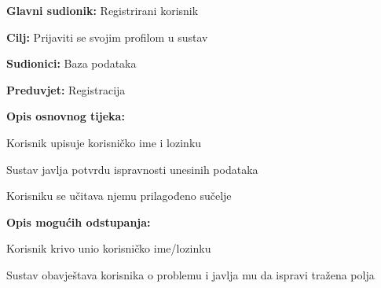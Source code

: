 					\noindent {}
					\begin{packed_item}
	
						\item \textbf{Glavni sudionik: }Registrirani korisnik
						\item  \textbf{Cilj:} Prijaviti se svojim profilom u sustav
						\item  \textbf{Sudionici:} Baza podataka
						\item  \textbf{Preduvjet:} Registracija
						\item  \textbf{Opis osnovnog tijeka:}
						
						\item[] \begin{packed_enum}
	
							\item Korisnik upisuje korisničko ime i lozinku 
							\item Sustav javlja potvrdu ispravnosti unesinih podataka
							\item Korisniku se učitava njemu prilagođeno sučelje
						\end{packed_enum}
						
						\item  \textbf{Opis mogućih odstupanja:}
						
						\item[] \begin{packed_item}
	
							\item[1.a] Korisnik krivo unio korisničko ime/lozinku
							\item[] \begin{packed_enum}
								
								\item Sustav obavještava korisnika o problemu i javlja mu da ispravi tražena polja
								
								
							\end{packed_enum}
							
						\end{packed_item}
					\end{packed_item}
					
					\pagebreak
					
